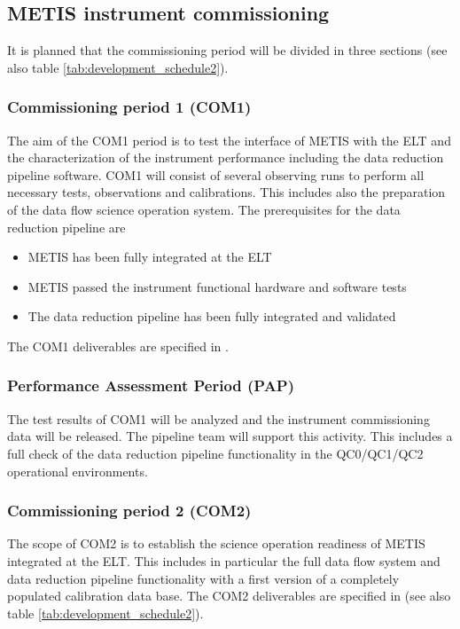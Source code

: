 \subsection{METIS instrument commissioning}
\label{ssec:com}

It is planned that the commissioning period will be divided in three sections (see also table \ref{tab:development_schedule2}).

\subsubsection{Commissioning period 1 (COM1)}
\label{ssec:com1}

The aim of the COM1 period is to test the interface of METIS with the ELT and the characterization of the instrument performance including the data reduction pipeline software. COM1 will consist of several observing runs to perform all necessary tests, observations and calibrations. This includes also the preparation of the data flow science operation system. The prerequisites for the data reduction pipeline are
\begin{itemize}
    \item METIS has been fully integrated at the ELT
    \item METIS passed the instrument functional hardware and software tests
    \item The data reduction pipeline  has been fully integrated and validated
\end{itemize}
The COM1 deliverables are specified in \cite{1618}.

\subsubsection{Performance Assessment Period (PAP)}
\label{ssec:pap}

The test results of COM1 will be analyzed and the instrument commissioning data will be released. The pipeline team will support this activity. This includes a full check of the data reduction pipeline functionality in the QC0/QC1/QC2 operational environments.

\subsubsection{Commissioning period 2 (COM2)}
\label{ssec:com2}

The scope of COM2 is to establish the science operation readiness of METIS integrated at the ELT. This includes in particular the full data flow system and data reduction pipeline functionality with a first version of a completely populated calibration data base. The COM2 deliverables are specified in \cite{1618} (see also table \ref{tab:development_schedule2}).

